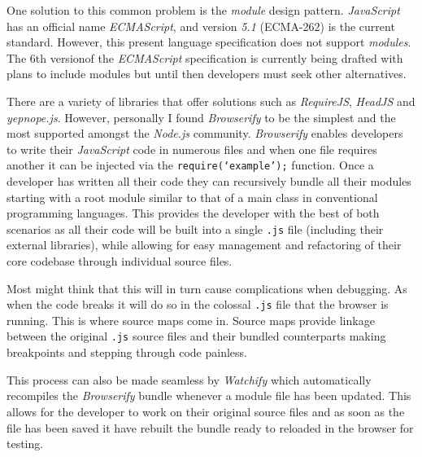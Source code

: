 \documentclass[final]{cmpreport}
\begin{document}
One solution to this common problem is the \textit{module} design pattern. \textit{JavaScript} has an official name \textit{ECMAScript}, and version \textit{5.1} (ECMA-262\footnotemark[18]) is the current standard. However, this present language specification does not support \textit{modules}. The 6th version\footnotemark[19] of the \textit{ECMAScript} specification is currently being drafted with plans to include modules but until then developers must seek other alternatives.


There are a variety of libraries that offer solutions such as \textit{RequireJS\footnotemark[20]}, \textit{HeadJS\footnotemark[21]} and \textit{yepnope.js\footnotemark[22]}. However, personally I found \textit{Browserify\footnotemark[23]} to be the simplest and the most supported amongst the \textit{Node.js} community. \textit{Browserify} enables developers to write their \textit{JavaScript} code in numerous files and when one file requires another it can be injected via the \texttt{require(`example');} function. Once a developer has written all their code they can recursively bundle all their modules starting with a root module similar to that of a main class in conventional programming languages. This provides the developer with the best of both scenarios as all their code will be built into a single \texttt{.js} file (including their external libraries), while allowing for easy management and refactoring of their core codebase through individual source files.



Most might think that this will in turn cause complications when debugging. As when the code breaks it will do so in the colossal \texttt{.js} file that the browser is running. This is where source maps come in. Source maps provide linkage between the original \texttt{.js} source files and their bundled counterparts making breakpoints and stepping through code painless. \cite{Seddon}

This process can also be made seamless by \textit{Watchify} which automatically recompiles the \textit{Browserify} bundle whenever a module file has been updated. This allows for the developer to work on their original source files and as soon as the file has been saved it have rebuilt the bundle ready to reloaded in the browser for testing.
\end{document}
